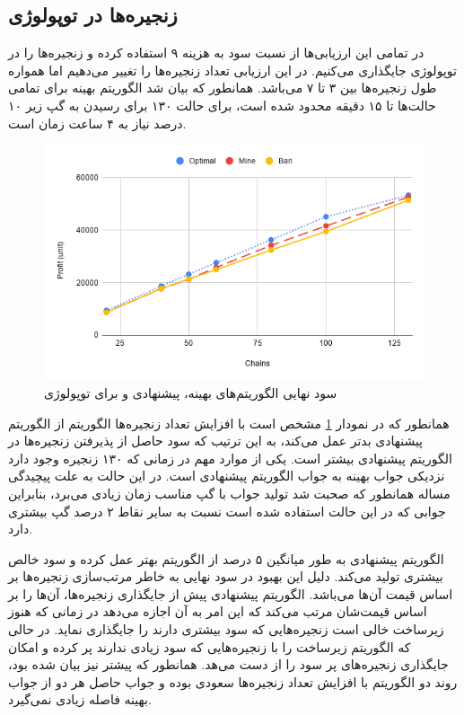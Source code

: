\subsection{زنجیره‌ها در توپولوژی }

در تمامی این ارزیابی‌ها از نسبت سود به هزینه ۹ استفاده کرده و زنجیره‌ها را در توپولوژی  جایگذاری می‌کنیم.
در این ارزیابی تعداد زنجیره‌ها را تغییر می‌دهیم اما همواره طول زنجیره‌ها بین ۳ تا ۷ می‌باشد.
همانطور که بیان شد الگوریتم بهینه برای تمامی حالت‌ها تا ۱۵ دقیقه محدود شده است، برای حالت ۱۳۰ برای رسیدن به گپ زیر ۱۰ درصد نیاز به ۴ ساعت زمان است.


\begin{figure}[h!]
\center\includegraphics[scale=.5]{images/chart-2}
\caption{سود نهایی الگوریتم‌های بهینه، پیشنهادی و \cite{Bari2015} برای توپولوژی }
\label{fig.7}
\end{figure}

همانطور که در نمودار \ref{fig.7} مشخص است با افزایش تعداد زنجیره‌ها الگوریتم \cite{Bari2015} از الگوریتم پیشنهادی بدتر عمل می‌کند،
به این ترتیب که سود حاصل از پذیرفتن زنجیره‌ها در الگوریتم پیشنهادی بیشتر است.
یکی از موارد مهم در زمانی که ۱۳۰ زنجیره وجود دارد نزدیکی جواب بهینه به جواب الگوریتم پیشنهادی است.
در این حالت به علت پیچیدگی مساله همانطور که صحبت شد تولید جواب با گپ مناسب زمان زیادی می‌برد،
بنابراین جوابی که در این حالت استفاده شده است نسبت به سایر نقاط ۲ درصد گپ بیشتری دارد.

الگوریتم پیشنهادی به طور میانگین ۵ درصد از الگوریتم \cite{Bari2015}
بهتر عمل کرده و سود خالص بیشتری تولید می‌کند.
دلیل این بهبود در سود نهایی به خاطر مرتب‌سازی زنجیره‌ها بر اساس قیمت آن‌ها می‌باشد.
الگوریتم پیشنهادی پیش از جایگذاری زنجیره‌ها، آن‌ها را بر اساس قیمت‌شان مرتب می‌کند
که این امر به آن اجازه می‌دهد در زمانی که هنوز زیرساخت خالی است زنجیره‌هایی که سود بیشتری دارند را جایگذاری نماید.
در حالی که الگوریتم \cite{Bari2015}
زیرساخت را با زنجیره‌هایی که سود زیادی ندارند پر کرده و امکان جایگذاری زنجیره‌های پر سود را از دست می‌هد.
همانطور که پیشتر نیز بیان شده بود، روند دو الگوریتم با افزایش تعداد زنجیره‌ها سعودی بوده و جواب حاصل هر دو از جواب بهینه فاصله
زیادی نمی‌گیرد.


